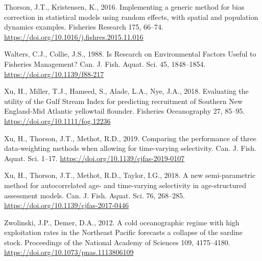 \documentclass[]{article}
\begin{document}
\leavevmode\hypertarget{ref-thorson2016Implementing}{}%
Thorson, J.T., Kristensen, K., 2016. Implementing a generic method for
bias correction in statistical models using random effects, with spatial
and population dynamics examples. Fisheries Research 175, 66--74.
\url{https://doi.org/10.1016/j.fishres.2015.11.016}

\leavevmode\hypertarget{ref-walters1988Research}{}%
Walters, C.J., Collie, J.S., 1988. Is Research on Environmental Factors
Useful to Fisheries Management? Can. J. Fish. Aquat. Sci. 45,
1848--1854. \url{https://doi.org/10.1139/f88-217}

\leavevmode\hypertarget{ref-xu2018Evaluating}{}%
Xu, H., Miller, T.J., Hameed, S., Alade, L.A., Nye, J.A., 2018.
Evaluating the utility of the Gulf Stream Index for predicting
recruitment of Southern New England-Mid Atlantic yellowtail flounder.
Fisheries Oceanography 27, 85--95.
\url{https://doi.org/10.1111/fog.12236}

\leavevmode\hypertarget{ref-xu2019Comparing}{}%
Xu, H., Thorson, J.T., Methot, R.D., 2019. Comparing the performance of
three data-weighting methods when allowing for time-varying selectivity.
Can. J. Fish. Aquat. Sci. 1--17.
\url{https://doi.org/10.1139/cjfas-2019-0107}

\leavevmode\hypertarget{ref-xu2018New}{}%
Xu, H., Thorson, J.T., Methot, R.D., Taylor, I.G., 2018. A new
semi-parametric method for autocorrelated age- and time-varying
selectivity in age-structured assessment models. Can. J. Fish. Aquat.
Sci. 76, 268--285. \url{https://doi.org/10.1139/cjfas-2017-0446}

\leavevmode\hypertarget{ref-zwolinski2012Cold}{}%
Zwolinski, J.P., Demer, D.A., 2012. A cold oceanographic regime with
high exploitation rates in the Northeast Pacific forecasts a collapse of
the sardine stock. Proceedings of the National Academy of Sciences 109,
4175--4180. \url{https://doi.org/10.1073/pnas.1113806109}

\pagebreak
\end{document}
